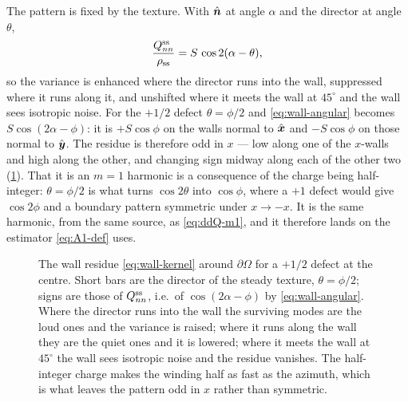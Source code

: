 \documentclass[a5paper]{article}
\begin{document}
The pattern is fixed by the texture. With $\nh$ at angle $\alpha$ and the director at angle $\theta$,
\begin{equation}
    \label{eq:wall-angular}
    \frac{Q^\ss_{nn}}{\rho_\ss} = S\,\cos2(\alpha-\theta),
\end{equation}
so the variance is enhanced where the director runs into the wall, suppressed where it runs along it, and unshifted where it meets the wall at $45^\circ$ and the wall sees isotropic noise. For the $+1/2$ defect $\theta=\phi/2$ and \eqref{eq:wall-angular} becomes $S\cos(2\alpha-\phi)$: it is $+S\cos\phi$ on the walls normal to $\hat{\bs x}$ and $-S\cos\phi$ on those normal to $\hat{\bs y}$. The residue is therefore odd in $x$ --- low along one of the $x$-walls and high along the other, and changing sign midway along each of the other two (\cref{fig:bc-wall}). That it is an $m=1$ harmonic is a consequence of the charge being half-integer: $\theta=\phi/2$ is what turns $\cos2\theta$ into $\cos\phi$, where a $+1$ defect would give $\cos2\phi$ and a boundary pattern symmetric under $x\to-x$. It is the same harmonic, from the same source, as \eqref{eq:ddQ-m1}, and it therefore lands on the estimator \eqref{eq:A1-def} uses.

\begin{figure}[h!]
    \centering
    \caption{\footnotesize The wall residue \eqref{eq:wall-kernel} around $\partial\Omega$ for a $+1/2$ defect at the centre. Short bars are the director of the steady texture, $\theta=\phi/2$; signs are those of $Q^\ss_{nn}$, i.e.\ of $\cos(2\alpha-\phi)$ by \eqref{eq:wall-angular}. Where the director runs into the wall the surviving modes are the loud ones and the variance is raised; where it runs along the wall they are the quiet ones and it is lowered; where it meets the wall at $45^\circ$ the wall sees isotropic noise and the residue vanishes. The half-integer charge makes the winding half as fast as the azimuth, which is what leaves the pattern odd in $x$ rather than symmetric.}
    \label{fig:bc-wall}
\end{figure}
\end{document}
